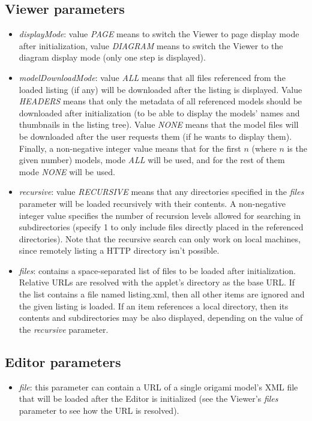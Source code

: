 \subsection{Viewer parameters}
\begin{itemize}
\item \emph{displayMode}: value \emph{PAGE} means to switch the Viewer to page display mode after initialization, value \emph{DIAGRAM} means to switch the Viewer to the diagram display mode (only one step is displayed).
\item \emph{modelDownloadMode}: value \emph{ALL} means that all files referenced from the loaded listing (if any) will be downloaded after the listing is displayed. Value \emph{HEADERS} means that only the metadata of all referenced models should be downloaded after initialization (to be able to display the models' names and thumbnails in the listing tree). Value \emph{NONE} means that the model files will be downloaded after the user requests them (if he wants to display them). Finally, a non-negative integer value means that for the first $n$ (where $n$ is the given number) models, mode \emph{ALL} will be used, and for the rest of them mode \emph{NONE} will be used.
\item \emph{recursive}: value \emph{RECURSIVE} means that any directories specified in the \emph{files} parameter will be loaded recursively with their contents. A non-negative integer value specifies the number of recursion levels allowed for searching in subdirectories (specify 1 to only include files directly placed in the referenced directories). Note that the recursive search can only work on local machines, since remotely listing a HTTP directory isn't possible.
\item \emph{files}: contains a space-separated list of files to be loaded after initialization. Relative URLs are resolved with the applet's directory as the base URL. If the list contains a file named listing.xml, then all other items are ignored and the given listing is loaded. If an item references a local directory, then its contents and subdirectories may be also displayed, depending on the value of the \emph{recursive} parameter.
\end{itemize}

\subsection{Editor parameters}
\begin{itemize}
\item \emph{file}: this parameter can contain a URL of a single origami model's XML file that will be loaded after the Editor is initialized (see the Viewer's \emph{files} parameter to see how the URL is resolved).
\end{itemize}

